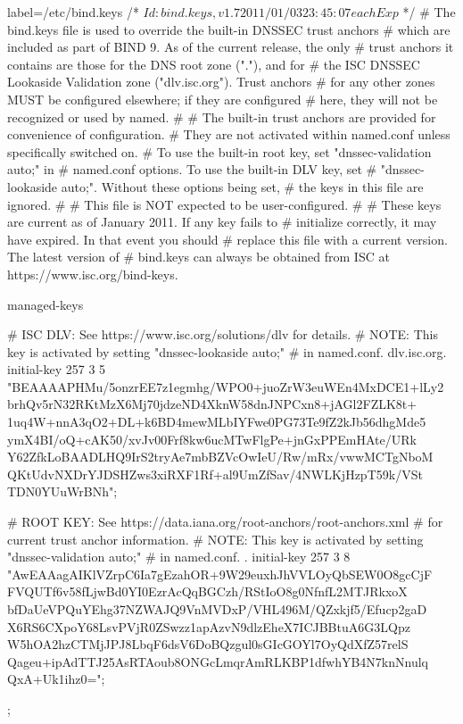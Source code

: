 \documentclass[a4paper,11pt]{article}
\begin{document}
\begin{bashcode*}{label=/etc/bind.keys}
/* $Id: bind.keys,v 1.7 2011/01/03 23:45:07 each Exp $ */
# The bind.keys file is used to override the built-in DNSSEC trust anchors
# which are included as part of BIND 9.  As of the current release, the only
# trust anchors it contains are those for the DNS root zone ("."), and for
# the ISC DNSSEC Lookaside Validation zone ("dlv.isc.org").  Trust anchors
# for any other zones MUST be configured elsewhere; if they are configured
# here, they will not be recognized or used by named.
#
# The built-in trust anchors are provided for convenience of configuration.
# They are not activated within named.conf unless specifically switched on.
# To use the built-in root key, set "dnssec-validation auto;" in
# named.conf options.  To use the built-in DLV key, set
# "dnssec-lookaside auto;".  Without these options being set,
# the keys in this file are ignored.
#
# This file is NOT expected to be user-configured.
#
# These keys are current as of January 2011.  If any key fails to
# initialize correctly, it may have expired.  In that event you should
# replace this file with a current version.  The latest version of
# bind.keys can always be obtained from ISC at https://www.isc.org/bind-keys.

managed-keys {
	# ISC DLV: See https://www.isc.org/solutions/dlv for details.
        # NOTE: This key is activated by setting "dnssec-lookaside auto;"
        # in named.conf.
	dlv.isc.org. initial-key 257 3 5 "BEAAAAPHMu/5onzrEE7z1egmhg/WPO0+juoZrW3euWEn4MxDCE1+lLy2
		brhQv5rN32RKtMzX6Mj70jdzeND4XknW58dnJNPCxn8+jAGl2FZLK8t+
		1uq4W+nnA3qO2+DL+k6BD4mewMLbIYFwe0PG73Te9fZ2kJb56dhgMde5
		ymX4BI/oQ+cAK50/xvJv00Frf8kw6ucMTwFlgPe+jnGxPPEmHAte/URk
		Y62ZfkLoBAADLHQ9IrS2tryAe7mbBZVcOwIeU/Rw/mRx/vwwMCTgNboM
		QKtUdvNXDrYJDSHZws3xiRXF1Rf+al9UmZfSav/4NWLKjHzpT59k/VSt
		TDN0YUuWrBNh";

	# ROOT KEY: See https://data.iana.org/root-anchors/root-anchors.xml
	# for current trust anchor information.
        # NOTE: This key is activated by setting "dnssec-validation auto;"
        # in named.conf.
	. initial-key 257 3 8 "AwEAAagAIKlVZrpC6Ia7gEzahOR+9W29euxhJhVVLOyQbSEW0O8gcCjF
		FVQUTf6v58fLjwBd0YI0EzrAcQqBGCzh/RStIoO8g0NfnfL2MTJRkxoX
		bfDaUeVPQuYEhg37NZWAJQ9VnMVDxP/VHL496M/QZxkjf5/Efucp2gaD
		X6RS6CXpoY68LsvPVjR0ZSwzz1apAzvN9dlzEheX7ICJBBtuA6G3LQpz
		W5hOA2hzCTMjJPJ8LbqF6dsV6DoBQzgul0sGIcGOYl7OyQdXfZ57relS
		Qageu+ipAdTTJ25AsRTAoub8ONGcLmqrAmRLKBP1dfwhYB4N7knNnulq
		QxA+Uk1ihz0=";
};
	
\end{bashcode*}
\end{document}
